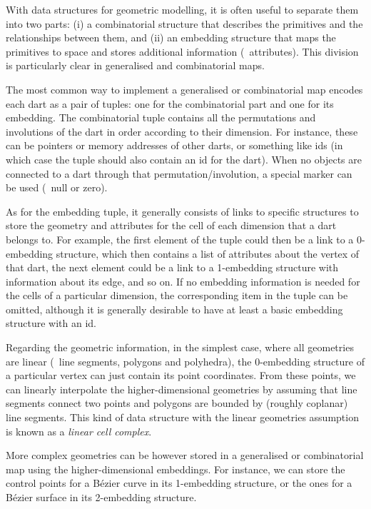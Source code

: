 With data structures for geometric modelling, it is often useful to separate them into two parts: (i) a combinatorial structure that describes the primitives and the relationships between them, and (ii) an embedding structure that maps the primitives to space and stores additional information (\eg\ attributes).
This division is particularly clear in generalised and combinatorial maps.

The most common way to implement a generalised or combinatorial map encodes each dart as a pair of tuples: one for the combinatorial part and one for its embedding.
The combinatorial tuple contains all the permutations and involutions of the dart in order according to their dimension.
For instance, these can be pointers or memory addresses of other darts, or something like ids (in which case the tuple should also contain an id for the dart).
When no objects are connected to a dart through that permutation/involution, a special marker can be used (\eg\ null or zero).

As for the embedding tuple, it generally consists of links to specific structures to store the geometry and attributes for the cell of each dimension that a dart belongs to.
For example, the first element of the tuple could then be a link to a 0-embedding structure, which then contains a list of attributes about the vertex of that dart, the next element could be a link to a 1-embedding structure with information about its edge, and so on.
If no embedding information is needed for the cells of a particular dimension, the corresponding item in the tuple can be omitted, although it is generally desirable to have at least a basic embedding structure with an id.

Regarding the geometric information, in the simplest case, where all geometries are linear (\ie\ line segments, polygons and polyhedra), the 0-embedding structure of a particular vertex can just contain its point coordinates.
From these points, we can linearly interpolate the higher-dimensional geometries by assuming that line segments connect two points and polygons are bounded by (roughly coplanar) line segments.
This kind of data structure with the linear geometries assumption is known as a \emph{linear cell complex}.

More complex geometries can be however stored in a generalised or combinatorial map using the higher-dimensional embeddings.
For instance, we can store the control points for a B\'ezier curve in its 1-embedding structure, or the ones for a B\'ezier surface in its 2-embedding structure.

